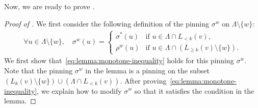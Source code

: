 \documentclass[11pt]{amsart}
\theoremstyle{definition}
\theoremstyle{remark}
\begin{document}
Now, we are ready to prove .
\begin{proof}[Proof of ]

We first consider the following definition of the pinning $\sigma^w$ on $\Lambda \setminus \{w\}$:
\begin{align}\label{eq:sigma-w-definition}
\forall u \in \Lambda \setminus \{w\}, \quad \sigma^w(u) = \begin{cases}
\sigma^*(u) & \text{if } u \in \Lambda \cap L_{<k}(v),\\
\rho^w(u) & \text{if } u \in \Lambda \cap (L_{\geq k}(v) \setminus \{w\}).
\end{cases}
\end{align}
We first show that~\eqref{eq:lemma:monotone-inequality} holds for this pinning $\sigma^w$.
Note that the pinning $\sigma^w$ in the lemma is a pinning on the subset $(L_k(v) \setminus \{w\}) \cup (\Lambda \cap L_{<k}(v))$. After proving~\eqref{eq:lemma:monotone-inequality}, we explain how to modify $\sigma^w$ so that it satisfies the condition in the lemma.



\end{proof}
\end{document}
